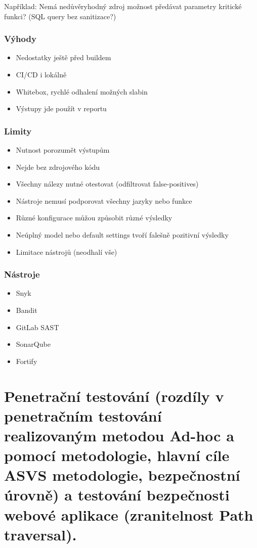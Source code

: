 Například: Nemá nedůvěryhodný zdroj možnost předávat parametry kritické funkci? (SQL query bez sanitizace?)

\subsubsection{Výhody}
\begin{itemize}
    \item Nedostatky ještě před buildem
    \item CI/CD i lokálně
    \item Whitebox, rychlé odhalení možných slabin
    \item Výstupy jde použít v reportu
\end{itemize}
\subsubsection{Limity}
\begin{itemize}
    \item Nutnost porozumět výstupům
    \item Nejde bez zdrojového kódu
    \item Všechny nálezy nutné otestovat (odfiltrovat false-positives)
    \item Nástroje nemusí podporovat všechny jazyky nebo funkce
    \item Různé konfigurace můžou způsobit různé výsledky
    \item Neúplný model nebo default settings tvoří falešně pozitivní výsledky
    \item Limitace nástrojů (neodhalí vše)
\end{itemize}
\subsubsection{Nástroje}
\begin{itemize}
    \item Snyk
    \item Bandit
    \item GitLab SAST
    \item SonarQube
    \item Fortify
\end{itemize}



\clearpage
\section{Penetrační testování (rozdíly v penetračním testování realizovaným metodou Ad-hoc a pomocí metodologie, hlavní cíle ASVS metodologie, bezpečnostní úrovně) a testování bezpečnosti webové aplikace (zranitelnost Path traversal).}

